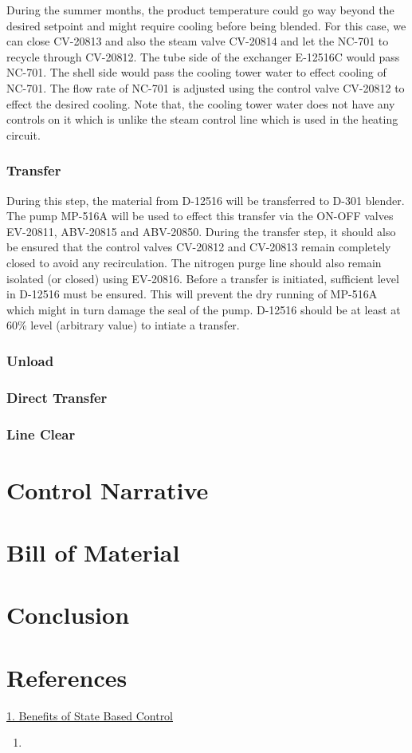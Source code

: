 \documentclass[a4paper,oneside]{article}
\begin{document}
During the summer months, the product temperature could go way beyond
the desired setpoint and might require cooling before being
blended. For this case, we can close CV-20813 and also the steam valve
CV-20814 and let the NC-701 to recycle through CV-20812. The tube side
of the exchanger E-12516C would pass NC-701. The shell side would pass
the cooling tower water to effect cooling of NC-701. The flow rate of
NC-701 is adjusted using the control valve CV-20812 to effect the
desired cooling. Note that, the cooling tower water does not have any
controls on it which is unlike the steam control line which is used in
the heating circuit.
\subsubsection*{Transfer}
\label{sec:org2146711}
During this step, the material from D-12516 will be transferred to
D-301 blender. The pump MP-516A will be used to effect this transfer
via the ON-OFF valves EV-20811, ABV-20815 and ABV-20850. During the
transfer step, it should also be ensured that the control valves
CV-20812 and CV-20813 remain completely closed to avoid any
recirculation. The nitrogen purge line should also remain isolated (or
closed) using EV-20816.  Before a transfer is initiated, sufficient
level in D-12516 must be ensured. This will prevent the dry running of
MP-516A which might in turn damage the seal of the pump. D-12516
should be at least at 60\% level (arbitrary value) to intiate a
transfer.
\subsubsection*{Unload}
\label{sec:org2cb4b1f}
\subsubsection*{Direct Transfer}
\label{sec:org8cced98}
\subsubsection*{Line Clear}
\label{sec:org181f0e9}

\section{Control Narrative}
\label{sec:org12d6324}
\section{Bill of Material}
\label{sec:orgab8dd84}
\section{Conclusion}
\label{sec:org47beee0}
\section{References}
\label{sec:orgbc17407}
\href{https://www.controlglobal.com/assets/knowledge\_centers/abb/assets/Benefits-of-state-based-control-white-paper.pdf}{1. Benefits of State Based Control}
\begin{enumerate}
\item 
\end{enumerate}
\end{document}
